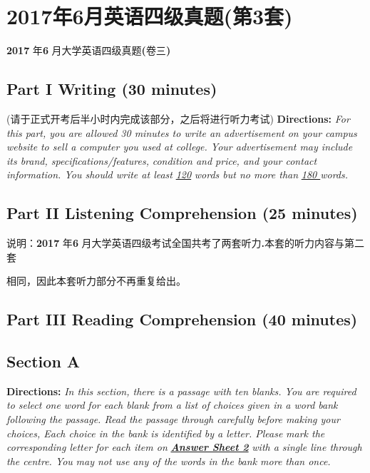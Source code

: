 \documentclass[UTF8,11pt]{ctexart}
\begin{document}
\section*{2017年6月英语四级真题(第3套)}
\textbf{2017} 年\textbf{6} 月大学英语四级真题\textbf{(}卷三\textbf{)}


\subsection*{\textbf{Part I} \textbf{Writing} \textbf{(30 minutes)}}


(请于正式开考后半小时内完成该部分，之后将进行听力考试) \textbf{Directions:}\textit{ For this part, you are allowed 30 minutes to write an advertisement on your campus website} \textit{to sell a computer you used at college. Your advertisement may include its brand, specifications/features,} \textit{condition and price, and your contact information. You should write at least }\textit{\uline{120}}\textit{ words but no more than} \textit{\uline{180 }}\textit{words.}


\subsection*{\textbf{Part II} \textbf{Listening Comprehension} \textbf{(25 minutes)}}


说明：\textbf{2017} 年\textbf{6} 月大学英语四级考试全国共考了两套听力\textbf{.}本套的听力内容与第二套


相同，因此本套听力部分不再重复给出。


\subsection*{\textbf{Part} III \textbf{Reading Comprehension} \textbf{(40 minutes)}}


\subsection*{\textbf{Section A}}


\textbf{Directions:}\textit{ In this section, there is a passage with ten blanks. You are required to select one word} \textit{for each blank from a list of choices given in a word bank following the passage. Read the passage} \textit{through carefully before making your choices, Each choice in the bank is identified by a letter. Please} \textit{mark the corresponding letter for each item on}\textbf{\textit{ }}\textbf{\textit{\uline{Answer Sheet 2}}}\textit{ with a single line through the centre. You} \textit{may not use any of the words in the bank more than once.}
\end{document}
